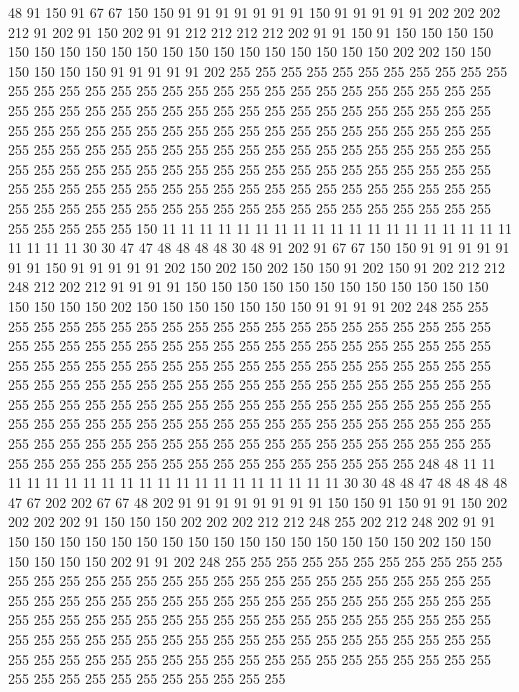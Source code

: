 48 91 150 91 67 67 150 150 91 91 91 91 91 91 91 150 91 91 91 91
91 202 202 202 212 91 202 91 150 202 91 91 212 212 212 212 202 91 91 150
91 150 150 150 150 150 150 150 150 150 150 150 150 150 150 150 150 150 150 150
202 202 150 150 150 150 150 150 91 91 91 91 91 202 255 255 255 255 255 255
255 255 255 255 255 255 255 255 255 255 255 255 255 255 255 255 255 255 255 255
255 255 255 255 255 255 255 255 255 255 255 255 255 255 255 255 255 255 255 255
255 255 255 255 255 255 255 255 255 255 255 255 255 255 255 255 255 255 255 255
255 255 255 255 255 255 255 255 255 255 255 255 255 255 255 255 255 255 255 255
255 255 255 255 255 255 255 255 255 255 255 255 255 255 255 255 255 255 255 255
255 255 255 255 255 255 255 255 255 255 255 255 255 255 255 255 255 255 255 255
255 255 255 255 255 255 255 255 255 255 255 255 255 255 255 255 255 255 255 255
255 255 255 150 11 11 11 11 11 11 11 11 11 11 11 11 11 11 11 11
11 11 11 11 11 11 11 30 30 47 47 48 48 48 48 30 48 91 202 91
67 67 150 150 91 91 91 91 91 91 91 150 91 91 91 91 91 202 150 202
150 202 150 150 91 202 150 91 202 212 212 248 212 202 212 91 91 91 91 150
150 150 150 150 150 150 150 150 150 150 150 150 150 150 150 202 150 150 150 150
150 150 150 91 91 91 91 202 248 255 255 255 255 255 255 255 255 255 255 255
255 255 255 255 255 255 255 255 255 255 255 255 255 255 255 255 255 255 255 255
255 255 255 255 255 255 255 255 255 255 255 255 255 255 255 255 255 255 255 255
255 255 255 255 255 255 255 255 255 255 255 255 255 255 255 255 255 255 255 255
255 255 255 255 255 255 255 255 255 255 255 255 255 255 255 255 255 255 255 255
255 255 255 255 255 255 255 255 255 255 255 255 255 255 255 255 255 255 255 255
255 255 255 255 255 255 255 255 255 255 255 255 255 255 255 255 255 255 255 255
255 255 255 255 255 255 255 255 255 255 255 255 255 255 255 255 255 255 255 255
248 48 11 11 11 11 11 11 11 11 11 11 11 11 11 11 11 11 11 11
11 11 30 30 48 48 47 48 48 48 48 47 67 202 202 67 67 48 202 91
91 91 91 91 91 91 91 150 150 91 150 91 91 150 202 202 202 202 91 150
150 150 202 202 202 212 212 248 255 202 212 248 202 91 91 150 150 150 150 150
150 150 150 150 150 150 150 150 150 150 150 202 150 150 150 150 150 150 202 91
91 202 248 255 255 255 255 255 255 255 255 255 255 255 255 255 255 255 255 255
255 255 255 255 255 255 255 255 255 255 255 255 255 255 255 255 255 255 255 255
255 255 255 255 255 255 255 255 255 255 255 255 255 255 255 255 255 255 255 255
255 255 255 255 255 255 255 255 255 255 255 255 255 255 255 255 255 255 255 255
255 255 255 255 255 255 255 255 255 255 255 255 255 255 255 255 255 255 255 255
255 255 255 255 255 255 255 255 255 255 255 255 255 255 255 255 255 255 255 255
